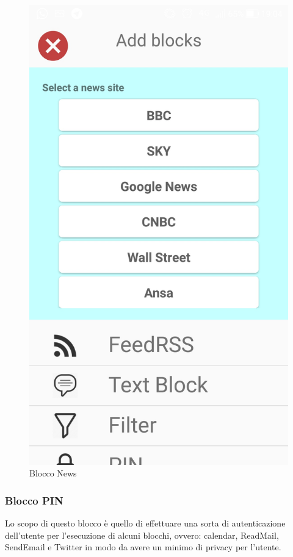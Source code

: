 \begin{figure}[!ht]
	\centering
	\includegraphics[scale=0.2]{images/BlockNews.jpg}
	\caption{Blocco News}
\end{figure}

\subsubsection{Blocco PIN}
Lo scopo di questo blocco è quello di effettuare una sorta di autenticazione dell'utente per l'esecuzione di alcuni blocchi, ovvero: calendar, ReadMail, SendEmail e Twitter in modo da avere un minimo di privacy per l'utente.

